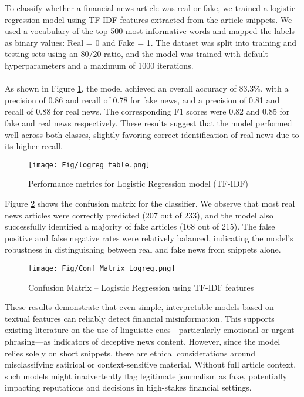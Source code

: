 \documentclass{article}
\begin{document}
To classify whether a financial news article was real or fake, we trained a logistic regression model using TF-IDF features extracted from the article snippets. We used a vocabulary of the top 500 most informative words and mapped the labels as binary values: Real = 0 and Fake = 1. The dataset was split into training and testing sets using an 80/20 ratio, and the model was trained with default hyperparameters and a maximum of 1000 iterations. 
\\\\
As shown in Figure \ref{fig:log_table}, the model achieved an overall accuracy of 83.3\%, with a precision of 0.86 and recall of 0.78 for fake news, and a precision of 0.81 and recall of 0.88 for real news. The corresponding F1 scores were 0.82 and 0.85 for fake and real news respectively. These results suggest that the model performed well across both classes, slightly favoring correct identification of real news due to its higher recall.

\begin{figure}[H]
    \centering
    \texttt{[image: Fig/logreg\_table.png]}
    \caption{Performance metrics for Logistic Regression model (TF-IDF)}
    \label{fig:log_table}
\end{figure}

Figure \ref{fig:log_confusion} shows the confusion matrix for the classifier. We observe that most real news articles were correctly predicted (207 out of 233), and the model also successfully identified a majority of fake articles (168 out of 215). The false positive and false negative rates were relatively balanced, indicating the model’s robustness in distinguishing between real and fake news from snippets alone.

\begin{figure}[H]
    \centering
    \texttt{[image: Fig/Conf\_Matrix\_Logreg.png]}
    \caption{Confusion Matrix – Logistic Regression using TF-IDF features}
    \label{fig:log_confusion}
\end{figure}

These results demonstrate that even simple, interpretable models based on textual features can reliably detect financial misinformation. This supports existing literature on the use of linguistic cues—particularly emotional or urgent phrasing—as indicators of deceptive news content. However, since the model relies solely on short snippets, there are ethical considerations around misclassifying satirical or context-sensitive material. Without full article context, such models might inadvertently flag legitimate journalism as fake, potentially impacting reputations and decisions in high-stakes financial settings.
\end{document}
